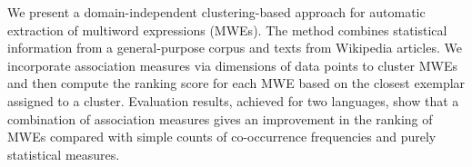 We present a domain-independent clustering-based approach for automatic extraction of multiword expressions (MWEs). The method combines statistical information from a general-purpose corpus and texts from Wikipedia articles. We incorporate association measures via dimensions of data points to cluster MWEs and then compute the ranking score for each MWE based on the closest exemplar assigned to a cluster. Evaluation results, achieved for two languages, show that a combination of association measures gives an improvement in the ranking of MWEs compared with simple counts of co-occurrence frequencies and purely statistical measures.
